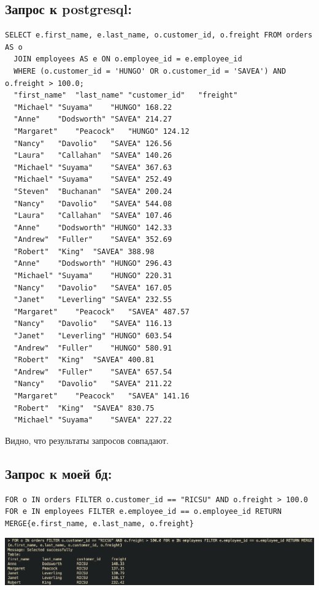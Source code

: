 \documentclass[12pt,onecolumn]{article}
\begin{document}
\subsection{Запрос к postgresql:}
\begin{lstlisting}[style=bash]
  SELECT e.first_name, e.last_name, o.customer_id, o.freight FROM orders AS o
  JOIN employees AS e ON o.employee_id = e.employee_id
  WHERE (o.customer_id = 'HUNGO' OR o.customer_id = 'SAVEA') AND o.freight > 100.0;
  "first_name"	"last_name"	"customer_id"	"freight"
  "Michael"	"Suyama"	"HUNGO"	168.22
  "Anne"	"Dodsworth"	"SAVEA"	214.27
  "Margaret"	"Peacock"	"HUNGO"	124.12
  "Nancy"	"Davolio"	"SAVEA"	126.56
  "Laura"	"Callahan"	"SAVEA"	140.26
  "Michael"	"Suyama"	"SAVEA"	367.63
  "Michael"	"Suyama"	"SAVEA"	252.49
  "Steven"	"Buchanan"	"SAVEA"	200.24
  "Nancy"	"Davolio"	"SAVEA"	544.08
  "Laura"	"Callahan"	"SAVEA"	107.46
  "Anne"	"Dodsworth"	"HUNGO"	142.33
  "Andrew"	"Fuller"	"SAVEA"	352.69
  "Robert"	"King"	"SAVEA"	388.98
  "Anne"	"Dodsworth"	"HUNGO"	296.43
  "Michael"	"Suyama"	"HUNGO"	220.31
  "Nancy"	"Davolio"	"SAVEA"	167.05
  "Janet"	"Leverling"	"SAVEA"	232.55
  "Margaret"	"Peacock"	"SAVEA"	487.57
  "Nancy"	"Davolio"	"SAVEA"	116.13
  "Janet"	"Leverling"	"HUNGO"	603.54
  "Andrew"	"Fuller"	"HUNGO"	580.91
  "Robert"	"King"	"SAVEA"	400.81
  "Andrew"	"Fuller"	"SAVEA"	657.54
  "Nancy"	"Davolio"	"SAVEA"	211.22
  "Margaret"	"Peacock"	"SAVEA"	141.16
  "Robert"	"King"	"SAVEA"	830.75
  "Michael"	"Suyama"	"SAVEA"	227.22
\end{lstlisting}

Видно, что результаты запросов совпадают.

\subsection{Запрос к моей бд:}
\begin{lstlisting}[style=bash]
  FOR o IN orders FILTER o.customer_id == "RICSU" AND o.freight > 100.0 FOR e IN employees FILTER e.employee_id == o.employee_id RETURN MERGE{e.first_name, e.last_name, o.freight}
\end{lstlisting}
\includegraphics{image/mydb1.png}
\end{document}
